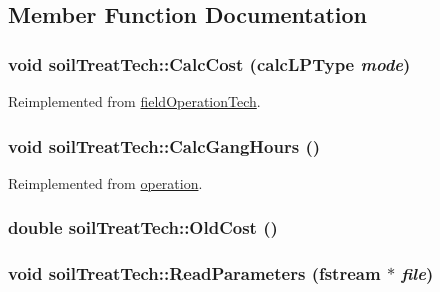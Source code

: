 \subsection{Member Function Documentation}
\hypertarget{classsoil_treat_tech_a988dd9310b22be5d36a28cdaa1dcc805}{
\subsubsection[{CalcCost}]{\setlength{\rightskip}{0pt plus 5cm}void soilTreatTech::CalcCost ({\bf calcLPType} {\em mode})}}
\label{classsoil_treat_tech_a988dd9310b22be5d36a28cdaa1dcc805}


Reimplemented from \hyperlink{classfield_operation_tech_a908e81a53479de1a6768d58964dbc57c}{fieldOperationTech}.\hypertarget{classsoil_treat_tech_a8cb69be7b91ff19c7ced98d10d8a3ff5}{
\subsubsection[{CalcGangHours}]{\setlength{\rightskip}{0pt plus 5cm}void soilTreatTech::CalcGangHours ()}}
\label{classsoil_treat_tech_a8cb69be7b91ff19c7ced98d10d8a3ff5}


Reimplemented from \hyperlink{classoperation_a51c5612f29519bc82050ffccf089bc07}{operation}.\hypertarget{classsoil_treat_tech_afc70675f94061c67fdcc613397b512f1}{
\subsubsection[{OldCost}]{\setlength{\rightskip}{0pt plus 5cm}double soilTreatTech::OldCost ()}}
\label{classsoil_treat_tech_afc70675f94061c67fdcc613397b512f1}
\hypertarget{classsoil_treat_tech_a43342c7563137af6f07fd4b031f3c599}{
\subsubsection[{ReadParameters}]{\setlength{\rightskip}{0pt plus 5cm}void soilTreatTech::ReadParameters (fstream $\ast$ {\em file})}}
\label{classsoil_treat_tech_a43342c7563137af6f07fd4b031f3c599}


